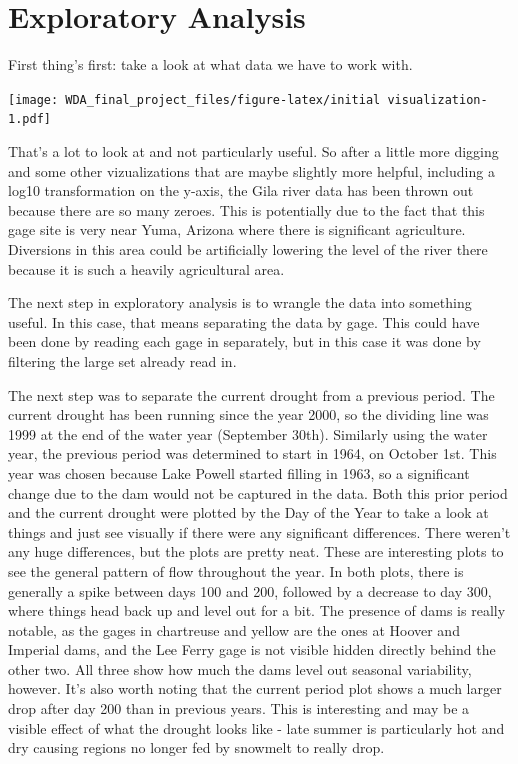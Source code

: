 \documentclass[
  12pt,
]{article}
\begin{document}
\hypertarget{exploratory-analysis}{%
\section{Exploratory Analysis}\label{exploratory-analysis}}

First thing's first: take a look at what data we have to work with.

\texttt{[image: WDA\_final\_project\_files/figure-latex/initial visualization-1.pdf]}

That's a lot to look at and not particularly useful. So after a little
more digging and some other vizualizations that are maybe slightly more
helpful, including a log10 transformation on the y-axis, the Gila river
data has been thrown out because there are so many zeroes. This is
potentially due to the fact that this gage site is very near Yuma,
Arizona where there is significant agriculture. Diversions in this area
could be artificially lowering the level of the river there because it
is such a heavily agricultural area.

The next step in exploratory analysis is to wrangle the data into
something useful. In this case, that means separating the data by gage.
This could have been done by reading each gage in separately, but in
this case it was done by filtering the large set already read in.

The next step was to separate the current drought from a previous
period. The current drought has been running since the year 2000, so the
dividing line was 1999 at the end of the water year (September 30th).
Similarly using the water year, the previous period was determined to
start in 1964, on October 1st. This year was chosen because Lake Powell
started filling in 1963, so a significant change due to the dam would
not be captured in the data. Both this prior period and the current
drought were plotted by the Day of the Year to take a look at things and
just see visually if there were any significant differences. There
weren't any huge differences, but the plots are pretty neat. These are
interesting plots to see the general pattern of flow throughout the
year. In both plots, there is generally a spike between days 100 and
200, followed by a decrease to day 300, where things head back up and
level out for a bit. The presence of dams is really notable, as the
gages in chartreuse and yellow are the ones at Hoover and Imperial dams,
and the Lee Ferry gage is not visible hidden directly behind the other
two. All three show how much the dams level out seasonal variability,
however. It's also worth noting that the current period plot shows a
much larger drop after day 200 than in previous years. This is
interesting and may be a visible effect of what the drought looks like -
late summer is particularly hot and dry causing regions no longer fed by
snowmelt to really drop.
\end{document}
